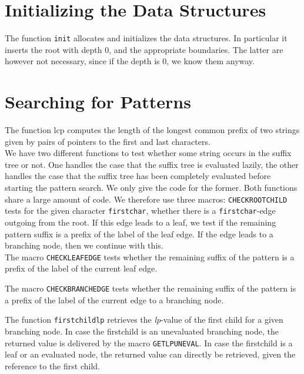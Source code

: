 \documentclass[a4paper]{article}
\begin{document}
\section{Initializing the Data Structures}

The function \texttt{init} allocates and initializes the data structures.
In particular it inserts the root with depth 0, and the appropriate boundaries.
The latter are however not necessary, since if the depth is 0, we know them
anyway.

\section{Searching for Patterns}

The function lcp computes the length of the longest common prefix of two
strings given by pairs of pointers to the first and last characters.\\

We have two different functions to test whether some string occurs in the
suffix tree or not. One handles the case that the suffix tree is evaluated
lazily, the other handles the case that the suffix tree has been completely
evaluated before starting the pattern search. We only give the code for the
former. Both functions share a large amount of code. We therefore use three
macros: \texttt{CHECKROOTCHILD} tests for the given character
\texttt{firstchar}, whether there is a \texttt{firstchar}-edge outgoing from
the root. If this edge leads to a leaf, we test if the remaining pattern
suffix is a prefix of the label of the leaf edge. If the edge leads to a
branching node, then we continue with this.\\

The macro \texttt{CHECKLEAFEDGE} tests whether the remaining suffix of the
pattern is a prefix of the label of the current leaf edge.


The macro \texttt{CHECKBRANCHEDGE} tests whether the remaining suffix of the
pattern is a prefix of the label of the current edge to a branching node.

The function \texttt{firstchildlp} retrieves the \emph{lp}-value of the first child
for a given branching node. In case the firstchild is an unevaluated
branching node, the returned value is delivered by the macro
\texttt{GETLPUNEVAL}. In case the firstchild is a leaf or
an evaluated node, the returned value can directly be retrieved,
given the reference to the first child.
\end{document}
